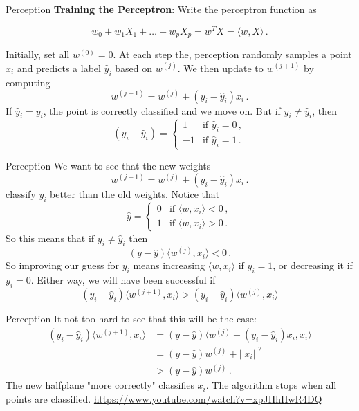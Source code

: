 \documentclass[10pt, table, dvipsnames,xcdraw, handout]{beamer}
\begin{document}
\begin{frame}[fragile]{Perception}
\textbf{Training the Perceptron}: Write the perceptron function as

$$
w_0+w_1X_1+\ldots+ w_pX_p = w^TX= \langle w, X\rangle\,.
$$

Initially, set all $w^{(0)}=0$. At each step the, perception randomly samples a point $x_i$ and predicts a label $\hat{y}_i$ based on $w^{(j)}$. \pause We then update to $w^{(j+1)}$ by computing
$$
w^{(j+1)} = w^{(j)} + (y_i - \hat{y}_i)x_i\,.
$$ \pause
If $\hat{y}_i = y_i$, the point is correctly classified and we move on. But if $y_i \neq \hat{y}_i$, then 
$$
(y_i - \hat{y}_i) = \begin{cases}
1 &\text{if } \hat{y}_i=0\,,
\\
-1 &\text{if } \hat{y}_i=1\,.
\end{cases}
$$ 

\end{frame}





\begin{frame}[fragile]{Perception}
We want to see that the new weights 
$$
w^{(j+1)} = w^{(j)} + (y_i - \hat{y}_i)x_i\,.
$$
classify $y_i$ better than the old weights. Notice that 
$$
\hat{y} = \begin{cases}
0 &\text{if } \langle w, x_i\rangle<0\,,
\\
1 &\text{if } \langle w, x_i\rangle>0\,.
\end{cases}
$$
So this means that if $y_i \neq \hat{y}_i$ then 
$$
(y-\hat{y})\langle w^{(j)}, x_i\rangle<0\,.
$$
So improving our guess for $y_i$ means increasing $\langle w, x_i\rangle$ if $y_i=1$, or decreasing it if $y_i=0$. Either way, we will have been successful if 
$$
(y_i-\hat{y}_i)\langle w^{(j+1)}, x_i\rangle > (y_i-\hat{y}_i)\langle w^{(j)}, x_i\rangle 
$$

\end{frame}


\begin{frame}[fragile]{Perception}
It not too hard to see that this will be the case:
\begin{align*}
(y_i-\hat{y}_i)\langle w^{(j+1)}, x_i\rangle &= (y-\hat{y})\langle w^{(j)} + (y_i - \hat{y}_i)x_i , x_i\rangle 
\\
&=
(y-\hat{y}) w^{(j)} + ||x_i||^2
\\
&>(y-\hat{y}) w^{(j)}\,.
\end{align*}
The new halfplane "more correctly" classifies $x_i$. The algorithm stops when all points are classified. 
\url{https://www.youtube.com/watch?v=xpJHhHwR4DQ}
\end{frame}
\end{document}
